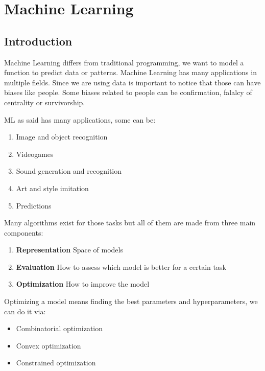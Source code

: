 \section{Machine Learning}


\subsection{Introduction}

Machine Learning differs from traditional programming, we want to model a function to predict data or patterns. Machine Learning has many applications in multiple fields. Since we are using data is important to notice that those can have biases like people. Some biases related to people can be confirmation, falalcy of centrality or survivorship.

\vspace{10pt}

ML as said has many applications, some can be:
\begin{enumerate}
    \item Image and object recognition
    \item Videogames
    \item Sound generation and recognition
    \item Art and style imitation
    \item Predictions
\end{enumerate}

\vspace{10pt}

Many algorithms exist for those tasks but all of them are made from three main components:
\begin{enumerate}
    \item \textbf{Representation} \ra Space of models
    \item \textbf{Evaluation} \ra How to assess which model is better for a certain task
    \item \textbf{Optimization} \ra How to improve the model
\end{enumerate}

Optimizing a model means finding the best parameters and hyperparameters, we can do it via:
\begin{itemize}
    \item Combinatorial optimization
    \item Convex optimization
    \item Constrained optimization
\end{itemize}

